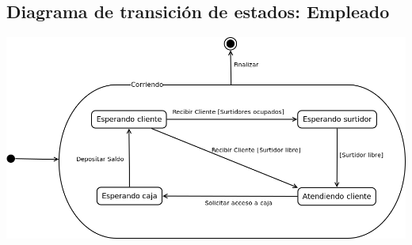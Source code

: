 \documentclass{article}
\begin{document}
\subsection{Diagrama de transición de estados: Empleado}
\includegraphics[width=\textwidth]{diagramaTransicionEstadosEmpleado}
\end{document}
